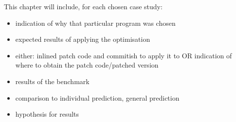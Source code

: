 This chapter will include, for each chosen case study:

\begin{itemize}
	\item indication of why that particular program was chosen
	\item expected results of applying the optimisation
	\item either: inlined patch code and commitish to apply it to OR indication of where to obtain the patch code/patched version
	\item results of the benchmark
	\item comparison to individual prediction, general prediction
	\item hypothesis for results
\end{itemize}

